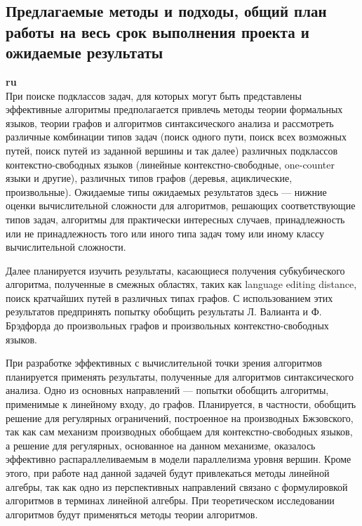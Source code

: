 \documentclass[12pt]{article}  %
\theoremstyle{remark}
\begin{document}
\subsection{Предлагаемые методы и подходы, общий план работы на весь срок выполнения проекта и ожидаемые результаты }

\textbf{ru}\\
При поиске подклассов задач, для которых могут быть представлены эффективные алгоритмы предполагается привлечь методы теории формальных языков, теории графов и алгоритмов синтаксического анализа и рассмотреть различные комбинации типов задач (поиск одного пути, поиск всех возможных путей, поиск путей из заданной вершины и так далее) различных подклассов контекстно-свободных языков (линейные контекстно-свободные, one-counter языки и другие), различных типов графов (деревья, ациклические, произвольные). Ожидаемые типы ожидаемых результатов здесь --- нижние оценки вычислительной сложности для алгоритмов, решающих соответствующие типов задач, алгоритмы для практически интересных случаев, принадлежность или не принадлежность того или иного типа задач тому или иному классу вычислительной сложности.

Далее планируется изучить результаты, касающиеся получения субкубического алгоритма, полученные в смежных областях, таких как language editing distance, поиск кратчайших путей в различных типах графов. С использованием этих результатов предпринять попытку обобщить результаты Л. Валианта и Ф. Брэдфорда до произвольных графов и произвольных контекстно-свободных языков.

При разработке эффективных с вычислительной точки зрения алгоритмов планируется применять результаты, полученные для алгоритмов синтаксического анализа. Одно из основных направлений --- попытки обобщить алгоритмы, применимые к линейному входу, до графов. Планируется, в частности, обобщить решение для регулярных ограничений, построенное на производных Бжзовского, так как сам механизм производных обобщаем для контекстно-свободных языков, а решение для регулярных, основанное на данном механизме, оказалось эффективно распараллеливаемым в модели параллелизма уровня вершин. Кроме этого, при работе над данной задачей будут привлекаться методы линейной алгебры, так как одно из перспективных направлений связано с формулировкой алгоритмов в терминах линейной алгебры. При теоретическом исследовании алгоритмов будут применяться методы теории алгоритмов.
\end{document}
